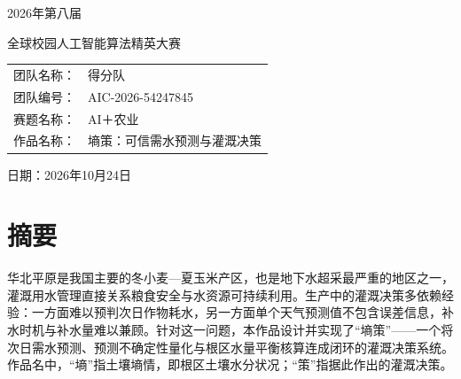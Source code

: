 \documentclass[UTF8,a4paper,11pt,fontset=fandol]{ctexart}
\renewcommand{\arraystretch}{1.22}
\begin{document}
\begin{titlepage}
\thispagestyle{empty}
\setlength{\parindent}{0pt}
\vspace*{8mm}
\begin{center}
{\Large 2026年第八届\par\vspace{2mm}全球校园人工智能算法精英大赛\par}
\vspace{6mm}{\LARGE\bfseries 算法主题赛\quad AI＋农业\par}
\vspace{4mm}{\LARGE 技术方案\par}
\vspace{14mm}{\color{forest}\rule{.82\linewidth}{1.2pt}\par}
\vspace{10mm}{\color{forest}\rule{.82\linewidth}{1.2pt}\par}
\end{center}
\vfill
\begin{center}
\renewcommand{\arraystretch}{1.9}
\begin{tabular}{@{}r@{\quad}l@{}}
\large 团队名称： & \large 得分队\\
\large 团队编号： & \large AIC-2026-54247845\\
\large 赛题名称： & \large AI＋农业\\
\large 作品名称： & \large 墒策：可信需水预测与灌溉决策\\
\end{tabular}
\end{center}
\vspace{16mm}
\begin{center}\large 日期：2026年10月24日\end{center}
\vspace{6mm}
\end{titlepage}
\section*{摘要}
华北平原是我国主要的冬小麦—夏玉米产区，也是地下水超采最严重的地区之一，灌溉用水管理直接关系粮食安全与水资源可持续利用。生产中的灌溉决策多依赖经验：一方面难以预判次日作物耗水，另一方面单个天气预测值不包含误差信息，补水时机与补水量难以兼顾。针对这一问题，本作品设计并实现了“墒策”——一个将次日需水预测、预测不确定性量化与根区水量平衡核算连成闭环的灌溉决策系统。作品名中，“墒”指土壤墒情，即根区土壤水分状况；“策”指据此作出的灌溉决策。
\end{document}
